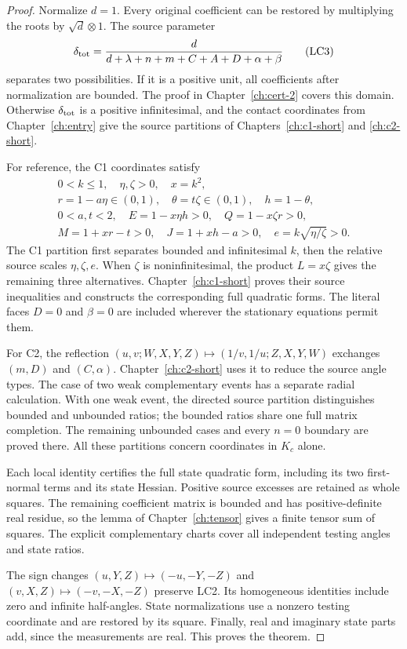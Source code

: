 \begin{proof}
Normalize $d=1$. Every original coefficient can be restored by
multiplying the roots by $\sqrt d\otimes1$. The source parameter
\[
 \delta_{\rm tot}=\frac d{d+\lambda+n+m+C+A+D+\alpha+\beta}
 \tag{LC3}
\]
separates two possibilities. If it is a positive unit, all coefficients
after normalization are bounded. The proof in
Chapter~\ref{ch:cert-2} covers this domain. Otherwise
$\delta_{\rm tot}$ is a positive infinitesimal, and the contact
coordinates from Chapter~\ref{ch:entry} give the source partitions
of Chapters~\ref{ch:c1-short} and \ref{ch:c2-short}.

For reference, the C1 coordinates satisfy
\[
\begin{gathered}
 0<k\le1,\quad \eta,\zeta>0,\quad x=k^2,\\
 r=1-a\eta\in(0,1),\quad\theta=t\zeta\in(0,1),\quad h=1-\theta,\\
 0<a,t<2,\quad E=1-x\eta h>0,\quad Q=1-x\zeta r>0,\\
 M=1+xr-t>0,\quad J=1+xh-a>0,\quad
 e=k\sqrt{\eta/\zeta}>0.
\end{gathered}\tag{LC4}
\]
The C1 partition first separates bounded and infinitesimal $k$, then
the relative source scales $\eta,\zeta,e$. When $\zeta$ is
noninfinitesimal, the product $L=x\zeta$ gives the remaining three
alternatives. Chapter~\ref{ch:c1-short} proves their source inequalities
and constructs the corresponding full quadratic forms. The literal
faces $D=0$ and $\beta=0$ are included wherever the stationary equations
permit them.

For C2, the reflection
$(u,v;W,X,Y,Z)\mapsto(1/v,1/u;Z,X,Y,W)$ exchanges
$(m,D)$ and $(C,\alpha)$. Chapter~\ref{ch:c2-short} uses it to reduce
the source angle types. The case of two weak complementary events
has a separate radial calculation. With one weak event, the directed
source partition distinguishes bounded and unbounded ratios; the
bounded ratios share one full matrix completion. The remaining
unbounded cases and every $n=0$ boundary are proved there. All these
partitions concern coordinates in $K_c$ alone.

Each local identity certifies the full state quadratic form, including
its two first-normal terms and its state Hessian. Positive source
excesses are retained as whole squares. The remaining coefficient
matrix is bounded and has positive-definite real residue, so the
lemma of Chapter~\ref{ch:tensor} gives a finite tensor sum of squares.
The explicit complementary charts cover all independent testing
angles and state ratios.

The sign changes
$(u,Y,Z)\mapsto(-u,-Y,-Z)$ and
$(v,X,Z)\mapsto(-v,-X,-Z)$ preserve LC2. Its homogeneous identities
include zero and infinite half-angles. State normalizations use a
nonzero testing coordinate and are restored by its square. Finally,
real and imaginary state parts add, since the measurements are real.
This proves the theorem.
\end{proof}


